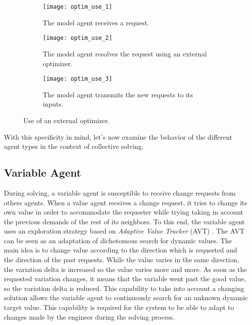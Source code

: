 \begin{figure}
	\centering
	\begin{subfigure}[b]{0.32\textwidth}
		\centering
		\texttt{[image: optim\_use\_1]}
		\caption{The model agent receives a request.}\label{optim_use:1}
	\end{subfigure}
	\hfill
	\begin{subfigure}[b]{0.32\textwidth}
		\centering
		\texttt{[image: optim\_use\_2]}
		\caption{The model agent resolves the request using an external optimizer.}\label{optim_use:2}
	\end{subfigure}
	\hfill
	\begin{subfigure}[b]{0.32\textwidth}
		\centering
		\texttt{[image: optim\_use\_3]}
		\caption{The model agent transmits the new requests to its inputs.}\label{optim_use:3}
	\end{subfigure}
	\caption{Use of an external optimizer.}\label{optim_use}
\end{figure}

With this specificity in mind, let's now examine the behavior of the different agent types in the context of collective solving.

\subsection{Variable Agent}

During solving, a variable agent is susceptible to receive change requests from others agents. When a value agent receives a change request, it tries to change its own value  in order to accommodate the requester while trying taking in account the previous demands of the rest of its neighbors. To this end, the variable agent  uses an exploration strategy based on \emph{Adaptive Value Tracker} (AVT) \cite{Lemouzy_2011}. The AVT can be seen as an adaptation of dichotomous search for dynamic values. The main idea is to change value according to the direction which is requested and the direction of the past requests. While the value varies in the same direction, the variation delta is increased so the value varies more and more. As soon as the requested variation changes, it means that the variable went past the good value, so the variation delta is reduced.
This capability to take into account a changing solution allows the variable agent to continuously search for an unknown dynamic target value. This capability is required for the system to be able to adapt to changes made by the engineer during the solving process.

